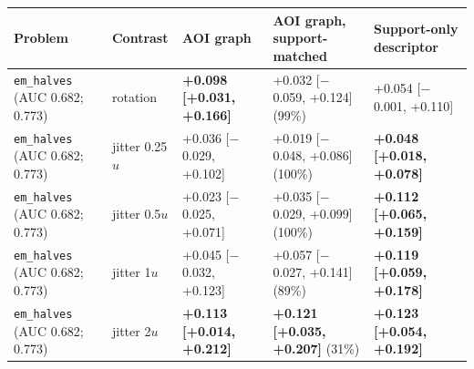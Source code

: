 \begin{tabular}{lllll}
\toprule
Problem & Contrast & AOI graph & AOI graph, support-matched & Support-only descriptor \\
\midrule
\texttt{em\_halves} (AUC 0.682; 0.773) & rotation & \textbf{+0.098 [+0.031, +0.166]} & +0.032 [$-$0.059, +0.124] (99\%) & +0.054 [$-$0.001, +0.110] \\
\texttt{em\_halves} (AUC 0.682; 0.773) & jitter 0.25$u$ & +0.036 [$-$0.029, +0.102] & +0.019 [$-$0.048, +0.086] (100\%) & \textbf{+0.048 [+0.018, +0.078]} \\
\texttt{em\_halves} (AUC 0.682; 0.773) & jitter 0.5$u$ & +0.023 [$-$0.025, +0.071] & +0.035 [$-$0.029, +0.099] (100\%) & \textbf{+0.112 [+0.065, +0.159]} \\
\texttt{em\_halves} (AUC 0.682; 0.773) & jitter 1$u$ & +0.045 [$-$0.032, +0.123] & +0.057 [$-$0.027, +0.141] (89\%) & \textbf{+0.119 [+0.059, +0.178]} \\
\texttt{em\_halves} (AUC 0.682; 0.773) & jitter 2$u$ & \textbf{+0.113 [+0.014, +0.212]} & \textbf{+0.121 [+0.035, +0.207]} (31\%) & \textbf{+0.123 [+0.054, +0.192]} \\
\bottomrule
\end{tabular}
